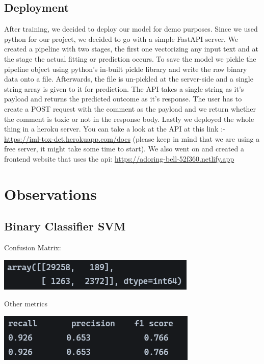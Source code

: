 \documentclass[11pt]{article}
\begin{document}
\subsection*{Deployment}
After training, we decided to deploy our model for demo purposes. 
Since we used python for our project, we decided to go with a simple FastAPI server.
We created a pipeline with two stages, the first one vectorizing any
input text and at the stage the actual fitting or prediction occurs. 
To save the model we pickle the pipeline object using python's in-built 
pickle library and write the raw binary data onto a file. 
Afterwards, the file is un-pickled at the server-side and a single string 
array is given to it for prediction. 
The API takes a single string as it's payload and returns the predicted outcome 
as it's response. The user has to create a POST request with the comment as the 
payload and we return whether the comment is toxic or not in the response body.
Lastly we deployed the whole thing in a heroku server.
You can take a look at the API at this link 
:- \url{https://iml-tox-det.herokuapp.com/docs}
(please keep in mind that we are using a free server, it might take some time to start). 
We also went on and created a frontend website that uses the api: 
\url{https://adoring-bell-52f360.netlify.app}
\section{Observations}
\subsection{Binary Classifier SVM}
Confusion Matrix:
\begin{center}
	\includegraphics[scale=0.75]{figs/conf_bSVM.png}
\end{center}
Other metrics
\begin{center}
	\includegraphics[scale=0.75]{figs/rpf_bSVM.png}	
\end{center}
\end{document}
